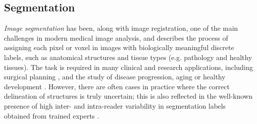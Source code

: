 %
\vspace{-2mm}
\subsection*{Segmentation}
\textit{Image segmentation} has been, along with image registration, one of the main challenges in modern medical image analysis, and describes the process of assigning each pixel or voxel in images with biologically meaningful discrete labels, such as anatomical structures and tissue types (e.g. pathology and healthy tissues). The task is required in many clinical and research applications, including surgical planning \cite{gering2001integrated,mazzara2004brain}, and the study of disease progression, aging or healthy development \cite{fischl2002whole,prastawa2005automatic,zijdenbos2002automatic}. However, there are often cases in practice where the correct delineation of structures is truly uncertain; this is also reflected in the well-known presence of high inter- and intra-reader variability in segmentation labels obtained from trained experts \cite{warfield2004simultaneous,joskowicz2018automatic,joskowicz2019inter}. 

